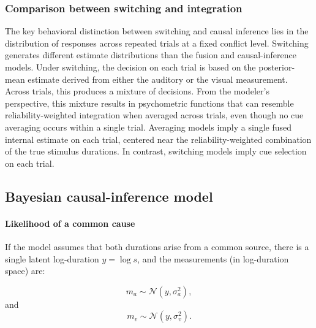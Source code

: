 \documentclass{jov}
\begin{document}

\subsubsection{Comparison between switching and integration}
The key behavioral distinction between switching and causal inference lies in the distribution of responses across repeated trials at a fixed conflict level. Switching generates different estimate distributions than the fusion and causal-inference models. Under switching, the decision on each trial is based on the posterior-mean estimate derived from either the auditory or the visual measurement. Across trials, this produces a mixture of decisions. From the modeler's perspective, this mixture results in psychometric functions that can resemble reliability-weighted integration when averaged across trials, even though no cue averaging occurs within a single trial. Averaging models imply a single fused internal estimate on each trial, centered near the reliability-weighted combination of the true stimulus durations. In contrast, switching models imply cue selection on each trial.

\subsection{Bayesian causal-inference model}\label{causal_inf_equations}

\paragraph{Likelihood of a common cause}

If the model assumes that both durations arise from a common source, there is a single latent log-duration $y = \log s$, and the measurements (in log-duration space) are:

\begin{equation}
\label{eq:ma_given_y}
m_a \sim \mathcal{N}(y, \sigma_a^2),
\end{equation}
and
\begin{equation}
\label{eq:mv_given_y}
m_v \sim \mathcal{N}(y, \sigma_v^2).
\end{equation}
\end{document}
